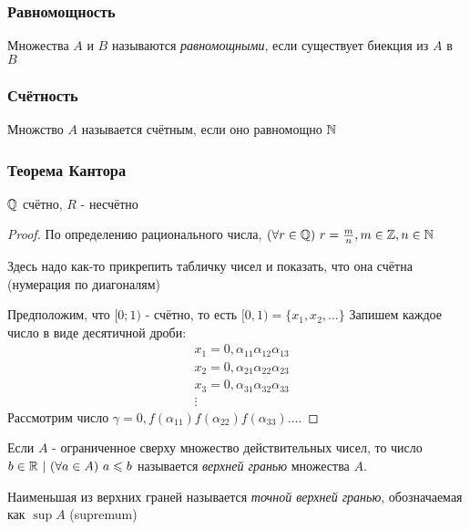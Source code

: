 \subsubsection*{Равномощность}

\begin{definition}
    Множества $A$ и $B$ называются \textit{равномощными}, если существует биекция из $A$ в $B$
\end{definition}

\subsubsection*{Счётность}

\begin{definition}
    Множство $A$ называется счётным, если оно равномощно $\mathbb{N}$
\end{definition}

\subsubsection*{Теорема Кантора}

\begin{proposition}
    $\mathbb{Q}$ счётно, $R$ - несчётно
\end{proposition}

\begin{proof}
    По определению рационального числа, $(\forall r \in \mathbb{Q})\ r = \frac{m}{n}, m \in \mathbb{Z}, n \in \mathbb{N}$
    
    Здесь надо как-то прикрепить табличку чисел и показать, что она счётна (нумерация по диагоналям)
    
    Предположим, что $[0; 1)$ - счётно, то есть $[0, 1) = \{x_1, x_2, \dots\}$
    Запишем каждое число в виде десятичной дроби:
    \begin{align*}
		&{x_1 = 0, \alpha_{11} \alpha_{12} \alpha_{13}}
        \\
        &{x_2 = 0, \alpha_{21} \alpha_{22} \alpha_{23}}
        \\
        &{x_3 = 0, \alpha_{31} \alpha_{32} \alpha_{33}}
        \\
        &\vdots
    \end{align*}
    Рассмотрим число $\gamma = 0, f(\alpha_{11}) f(\alpha_{22}) f(\alpha_{33}) \dots$.
\end{proof}

\begin{definition}
    Если $A$ - ограниченное сверху множество действительных чисел, то число $b \in \mathbb{R}\ |\ (\forall a \in A)\ a \leqslant b$ называется \textit{верхней гранью} множества $A$.
    
    Наименьшая из верхних граней называется \textit{точной верхней гранью}, обозначаемая как $\sup A$ (supremum)
\end{definition}

